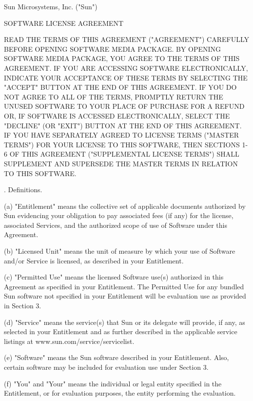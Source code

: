 \bigskip 
\bigskip 
\par \noindent Sun Microsystems, Inc. ("Sun")
\par \noindent SOFTWARE LICENSE AGREEMENT
\bigskip 
\par \noindent READ THE TERMS OF THIS AGREEMENT ("AGREEMENT") CAREFULLY BEFORE OPENING SOFTWARE MEDIA PACKAGE. BY OPENING SOFTWARE MEDIA PACKAGE, YOU AGREE TO THE TERMS OF THIS AGREEMENT. IF YOU ARE ACCESSING SOFTWARE ELECTRONICALLY, INDICATE YOUR ACCEPTANCE OF THESE TERMS BY SELECTING THE "ACCEPT" BUTTON AT THE END OF THIS AGREEMENT. IF YOU DO NOT AGREE TO ALL OF THE TERMS, PROMPTLY RETURN THE UNUSED SOFTWARE TO YOUR PLACE OF PURCHASE FOR A REFUND OR, IF SOFTWARE IS ACCESSED ELECTRONICALLY, SELECT THE "DECLINE" (OR "EXIT") BUTTON AT THE END OF THIS AGREEMENT. IF YOU HAVE SEPARATELY AGREED TO LICENSE TERMS ("MASTER TERMS") FOR YOUR LICENSE TO THIS SOFTWARE, THEN SECTIONS 1-6 OF THIS AGREEMENT ("SUPPLEMENTAL LICENSE TERMS") SHALL SUPPLEMENT AND SUPERSEDE THE MASTER TERMS IN RELATION TO THIS SOFTWARE.
\bigskip 
\par {}.      Definitions.
\bigskip 
\par \noindent (a)     "Entitlement" means the collective set of applicable documents authorized by Sun evidencing your obligation to pay associated fees (if any) for the license, associated Services, and the authorized scope of use of Software under this Agreement.
\bigskip 
\par \noindent (b)     "Licensed Unit" means the unit of measure by which your use of Software and/or Service is licensed, as described in your Entitlement.
\bigskip 
\par \noindent (c)     "Permitted Use" means the licensed Software use(s) authorized in this Agreement as specified in your Entitlement. The Permitted Use for any bundled Sun software not specified in your Entitlement will be evaluation use as provided in Section 3.
\bigskip 
\par \noindent (d)     "Service" means the service(s) that Sun or its delegate will provide, if any, as selected in your Entitlement and as further described in the applicable service listings at www.sun.com/service/servicelist.
\bigskip 
\par \noindent (e)     "Software" means the Sun software described in your Entitlement. Also, certain software may be included for evaluation use under Section 3. 
\bigskip 
\par \noindent (f)     "You" and "Your" means the individual or legal entity specified in the Entitlement, or for evaluation purposes, the entity performing the evaluation.
